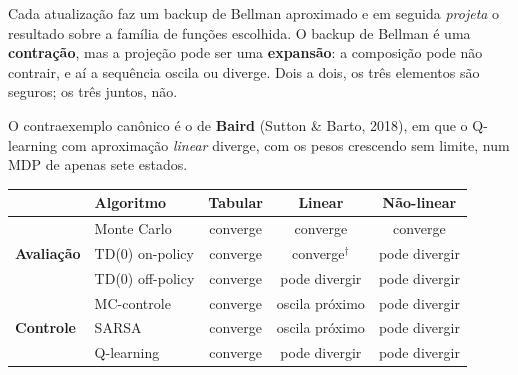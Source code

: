 \documentclass[11pt]{article}
\begin{document}
\begin{center}
\end{center}

Cada atualização faz um backup de Bellman aproximado e em seguida
\emph{projeta} o resultado sobre a família de funções escolhida. O backup de
Bellman é uma \textbf{contração}, mas a projeção pode ser uma
\textbf{expansão}: a composição pode não contrair, e aí a sequência oscila ou
diverge. Dois a dois, os três elementos são seguros; os três juntos, não.

\begin{alertabox}
  O contraexemplo canônico é o de \textbf{Baird} (Sutton \& Barto, 2018), em que
  o Q-learning com aproximação \emph{linear} diverge, com os pesos crescendo sem
  limite, num MDP de apenas sete estados.
\end{alertabox}

\begin{center}\small
\begin{tabular}{llccc}
  \toprule
  & Algoritmo & Tabular & Linear & Não-linear \\
  \midrule
  \multirow{3}{*}{\textbf{Avaliação}}
    & Monte Carlo      & converge & converge          & converge \\
    & TD(0) on-policy  & converge & converge$^{\dagger}$ & pode divergir \\
    & TD(0) off-policy & converge & pode divergir     & pode divergir \\
  \midrule
  \multirow{3}{*}{\textbf{Controle}}
    & MC-controle      & converge & oscila próximo    & pode divergir \\
    & SARSA            & converge & oscila próximo    & pode divergir \\
    & Q-learning       & converge & pode divergir     & pode divergir \\
  \bottomrule
\end{tabular}
\end{center}
\end{document}
